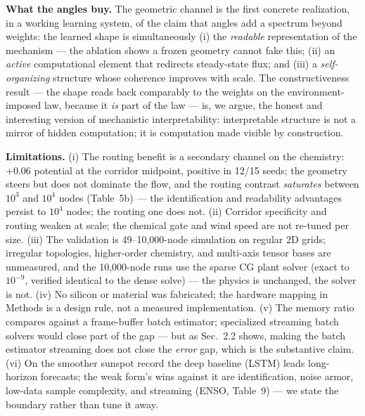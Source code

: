 \documentclass[10pt]{article}
\begin{document}
\textbf{What the angles buy.} The geometric channel is the first concrete realization,
in a working learning system, of the claim that angles add a spectrum beyond weights:
the learned shape is simultaneously (i) the \emph{readable} representation of the
mechanism --- the ablation shows a frozen geometry cannot fake this; (ii) an
\emph{active} computational element that redirects steady-state flux; and (iii) a
\emph{self-organizing} structure whose coherence improves with scale. The
constructiveness result --- the shape reads back comparably to the weights on the
environment-imposed law, because it \emph{is} part of the law --- is, we argue, the
honest and interesting version of mechanistic interpretability: interpretable structure
is not a mirror of hidden computation; it is computation made visible by construction.

\textbf{Limitations.} (i) The routing benefit is a secondary channel on the chemistry:
$+0.06$ potential at the corridor midpoint, positive in 12/15 seeds; the geometry
steers but does not dominate the flow, and the routing contrast \emph{saturates}
between $10^3$ and $10^4$ nodes (Table~5b) --- the identification and readability
advantages persist to $10^4$ nodes; the routing one does not. (ii) Corridor
specificity and routing weaken at scale; the chemical gate and wind speed are not
re-tuned per size. (iii) The validation is 49--10,000-node simulation on regular
2D grids; irregular topologies, higher-order chemistry, and multi-axis tensor bases
are unmeasured, and the 10,000-node runs use the sparse CG plant solver (exact to
$10^{-9}$, verified identical to the dense solve) --- the physics is unchanged, the
solver is not. (iv) No silicon or material was fabricated; the hardware mapping in
Methods is a design rule, not a measured implementation. (v) The memory ratio
compares against a frame-buffer batch estimator; specialized streaming batch
solvers would close part of the gap --- but as Sec.~2.2 shows, making the batch
estimator streaming does not close the \emph{error} gap, which is the substantive
claim. (vi) On the smoother sunspot record the deep baseline (LSTM) leads long-
horizon forecasts; the weak form's wins against it are identification, noise armor,
low-data sample complexity, and streaming (ENSO, Table~9) --- we state the boundary
rather than tune it away.
\end{document}
